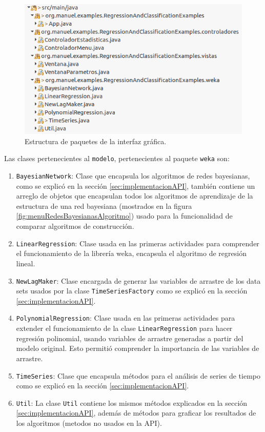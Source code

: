 \begin{figure}[ht]%
	\centering
	\includegraphics[width=15cm]{img/paquetesInterfaz.png}
	\caption{Estructura de paquetes de la interfaz gráfica.}
	\label{fig:estructuraAPI}
\end{figure}

Las clases pertenecientes al \texttt{modelo}, pertenecientes al paquete \texttt{weka} son:

\renewcommand{\labelenumi}{$\bullet$ }
\begin{enumerate}
	\item \texttt{BayesianNetwork}: Clase que encapsula los algoritmos de redes bayesianas, como se explicó en la sección \ref{sec:implementacionAPI}, también contiene un arreglo de objetos que encapsulan todos los algoritmos de aprendizaje de  la estructura de una red bayesiana (mostrados en la figura \ref{fig:menuRedesBayesianasAlgoritmo}) usado para la funcionalidad de comparar algoritmos de construcción.
	
	\item \texttt{LinearRegression}: Clase usada en las primeras actividades para comprender el funcionamiento de la librería weka, encapsula el algoritmo de regresión lineal.
	
	\item \texttt{NewLagMaker}: Clase encargada de generar las variables de arrastre de los data sets usados por la clase \texttt{TimeSeriesFactory} como se explicó en la sección \ref{sec:implementacionAPI}.
	
	\item \texttt{PolynomialRegression}: Clase usada en las primeras actividades para extender el funcionamiento de la clase \texttt{LinearRegression} para hacer regresión polinomial, usando variables de arrastre generadas a partir del modelo original. Esto permitió comprender la importancia de las variables de arrastre. %
	
	\item \texttt{TimeSeries}: Clase que encapsula métodos para el análisis de series de tiempo como se explicó en la sección \ref{sec:implementacionAPI}.
	
	\item \texttt{Util}: La clase \texttt{Util} contiene los mismos métodos explicados en la sección \ref{sec:implementacionAPI}, además de métodos para graficar los resultados de los algoritmos (metodos no usados en la API).	
\end{enumerate}


